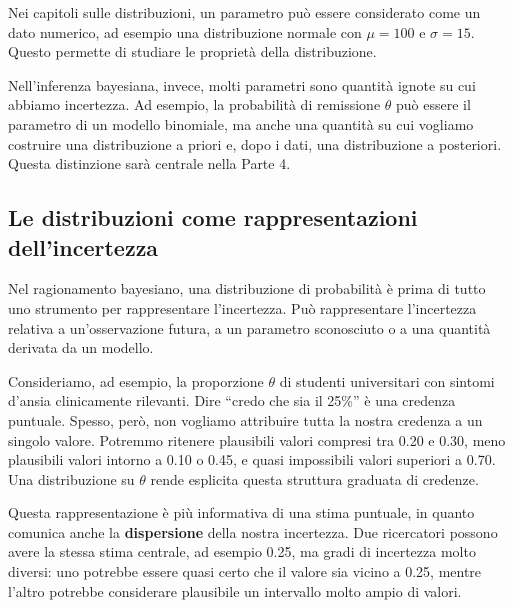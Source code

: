\documentclass[
  italian,
  letterpaper,
  a4paper,
  11pt,
  open=any]{scrbook}
\theoremstyle{plain}
\theoremstyle{definition}
\theoremstyle{definition}
\theoremstyle{remark}
\begin{document}
\begin{tcolorbox}[enhanced jigsaw, arc=.35mm, bottomrule=.15mm, bottomtitle=1mm, breakable, colback=white, colbacktitle=quarto-callout-note-color!10!white, colframe=quarto-callout-note-color-frame, coltitle=black, left=2mm, leftrule=.75mm, opacityback=0, opacitybacktitle=0.6, rightrule=.15mm, title=\textcolor{quarto-callout-note-color}{\faInfo}\hspace{0.5em}{Parametro della distribuzione e parametro inferenziale}, titlerule=0mm, toprule=.15mm, toptitle=1mm]

Nei capitoli sulle distribuzioni, un parametro può essere considerato
come un dato numerico, ad esempio una distribuzione normale con
\(\mu = 100\) e \(\sigma = 15\). Questo permette di studiare le
proprietà della distribuzione.

Nell'inferenza bayesiana, invece, molti parametri sono quantità ignote
su cui abbiamo incertezza. Ad esempio, la probabilità di remissione
\(\theta\) può essere il parametro di un modello binomiale, ma anche una
quantità su cui vogliamo costruire una distribuzione a priori e, dopo i
dati, una distribuzione a posteriori. Questa distinzione sarà centrale
nella Parte 4.

\end{tcolorbox}

\subsection{Le distribuzioni come rappresentazioni
dell'incertezza}\label{le-distribuzioni-come-rappresentazioni-dellincertezza}

Nel ragionamento bayesiano, una distribuzione di probabilità è prima di
tutto uno strumento per rappresentare l'incertezza. Può rappresentare
l'incertezza relativa a un'osservazione futura, a un parametro
sconosciuto o a una quantità derivata da un modello.

Consideriamo, ad esempio, la proporzione \(\theta\) di studenti
universitari con sintomi d'ansia clinicamente rilevanti. Dire ``credo
che sia il 25\%'' è una credenza puntuale. Spesso, però, non vogliamo
attribuire tutta la nostra credenza a un singolo valore. Potremmo
ritenere plausibili valori compresi tra 0.20 e 0.30, meno plausibili
valori intorno a 0.10 o 0.45, e quasi impossibili valori superiori a
0.70. Una distribuzione su \(\theta\) rende esplicita questa struttura
graduata di credenze.

Questa rappresentazione è più informativa di una stima puntuale, in
quanto comunica anche la \textbf{dispersione} della nostra incertezza.
Due ricercatori possono avere la stessa stima centrale, ad esempio 0.25,
ma gradi di incertezza molto diversi: uno potrebbe essere quasi certo
che il valore sia vicino a 0.25, mentre l'altro potrebbe considerare
plausibile un intervallo molto ampio di valori.
\end{document}
